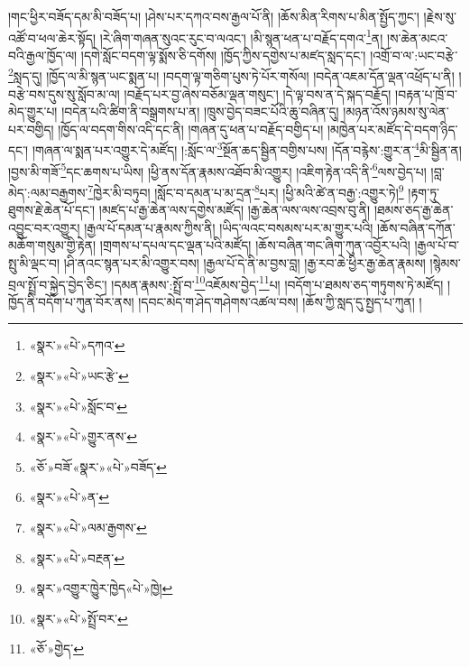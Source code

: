 །གང་ཕྱིར་བཟོད་དམ་མི་བཟོད་པ། །ཤེས་པར་དཀའ་བས་རྒྱལ་པོ་ནི། །ཆོས་མིན་རིགས་པ་མིན་སྤྱོད་ཀྱང་། །རྗེས་སུ་འཚོ་བ་ཕལ་ཆེར་སྟོད། །རེ་ཞིག་གཞན་སུའང་རུང་བ་ལའང་། །མི་སྙན་ཕན་པ་བརྗོད་དགའ་\footnote{«སྣར་»«པེ་»དཀའ་}ན། །ས་ཆེན་མངའ་བའི་རྒྱལ་ཁྱོད་ལ། །དགེ་སློང་བདག་ལྟ་སྨོས་ཅི་དགོས། །ཁྱོད་ཀྱིས་དགྱེས་པ་མཛད་སླད་དང་། །འགྲོ་བ་ལ་:ཡང་བརྩེ་\footnote{«སྣར་»«པེ་»ཡང་རྩེ་}སླད་དུ། །ཁྱོད་ལ་མི་སྙན་ཡང་སྨན་པ། །བདག་ལྟ་གཅིག་པུས་ཏེ་པོར་གསོལ། །བདེན་འཇམ་དོན་ལྡན་འཕྲོད་པ་ནི། །བརྩེ་བས་དུས་སུ་སློབ་མ་ལ། །བརྗོད་པར་བྱ་ཞེས་བཅོམ་ལྡན་གསུང་། །དེ་ལྟ་བས་ན་དེ་སྐད་བརྗོད། །བརྟན་པ་ཁྲོ་བ་མེད་གྱུར་པ། །བདེན་པའི་ཚིག་ནི་བསྒྲགས་པ་ན། །ཁྲུས་བྱེད་བཟང་པོའི་ཆུ་བཞིན་དུ། །མཉན་འོས་ཉམས་སུ་ལེན་པར་བགྱིད། །ཁྱོད་ལ་བདག་གིས་འདི་དང་ནི། །གཞན་དུ་ཕན་པ་བརྗོད་བགྱིད་པ། །མཁྱེན་པར་མཛོད་དེ་བདག་ཉིད་དང་། །གཞན་ལ་སྨན་པར་འགྱུར་དེ་མཛོད། །:སློང་ལ་\footnote{«སྣར་»«པེ་»སློང་བ་}སྔོན་ཆད་སྦྱིན་བགྱིས་པས། །དོན་བརྙེས་:གྱུར་ན་\footnote{«སྣར་»«པེ་»གྱུར་ནས་}མི་སྦྱིན་ན། །བྱས་མི་གཟོ་\footnote{«ཅོ་»བཟོ་«སྣར་»«པེ་»བཟོད་}དང་ཆགས་པ་ཡིས། །ཕྱི་ནས་དོན་རྣམས་འཐོབ་མི་འགྱུར། །འཇིག་རྟེན་འདི་ནི་\footnote{«སྣར་»«པེ་»ན་}ལས་བྱེད་པ། །བླ་མེད་:ལམ་བརྒྱགས་\footnote{«སྣར་»«པེ་»ལམ་རྒྱགས་}ཁྱེར་མི་བཏུབ། །སློང་བ་དམན་པ་མ་དྲན་\footnote{«སྣར་»«པེ་»བརྔན་}པར། །ཕྱི་མའི་ཚེ་ན་བརྒྱ་:འགྱུར་ཏེ།\footnote{«སྣར་»འགྱུར་ཁྱེུར་ཁྱེད«པེ་»ཁྱེ།} །རྟག་ཏུ་ཐུགས་རྗེ་ཆེན་པོ་དང་། །མཛད་པ་རྒྱ་ཆེན་ལས་དགྱེས་མཛོད། །རྒྱ་ཆེན་ལས་ལས་འབྲས་བུ་ནི། །ཐམས་ཅད་རྒྱ་ཆེན་འབྱུང་བར་འགྱུར། །རྒྱལ་པོ་དམན་པ་རྣམས་ཀྱིས་ནི། །ཡིད་ལའང་བསམས་པར་མ་གྱུར་པའི། །ཆོས་བཞིན་དཀོན་མཆོག་གསུམ་གྱི་རྟེན། །གྲགས་པ་དཔལ་དང་ལྡན་པའི་མཛོད། །ཆོས་བཞིན་གང་ཞིག་ཀུན་འབྱོར་པའི། །རྒྱལ་པོ་བ་སྤུ་མི་ལྡང་བ། །ཤི་ནའང་སྙན་པར་མི་འགྱུར་བས། །རྒྱལ་པོ་དེ་ནི་མ་བྱས་བླ། །རྒྱ་རབ་ཆེ་ཕྱིར་རྒྱ་ཆེན་རྣམས། །སྙེམས་བྲལ་སྤྲོ་བ་སྐྱེད་བྱེད་ཅིང་། །དམན་རྣམས་:སྤྲོ་བ་\footnote{«སྣར་»«པེ་»སྤྲོ་བར་}འཇོམས་བྱེད་\footnote{«ཅོ་»གྱེད་}པ། །བདོག་པ་ཐམས་ཅད་གཏུགས་ཏེ་མཛོད། །ཁྱོད་ནི་བདོག་པ་ཀུན་བོར་ནས། །དབང་མེད་ག་ཤེད་གཤེགས་འཚལ་བས། །ཆོས་ཀྱི་སླད་དུ་སྤྱད་པ་ཀུན། །
